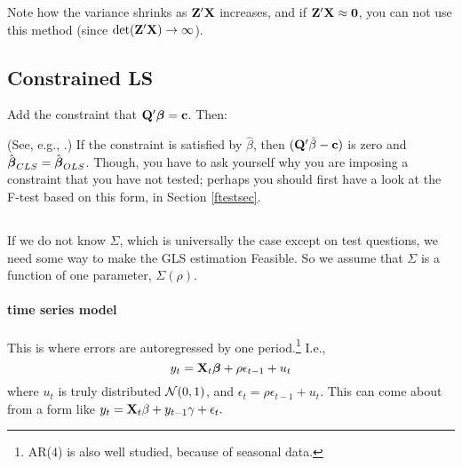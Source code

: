 
Note how the variance shrinks as ${\bf Z}'{\bf X}$ increases, and if
${\bf Z}'{\bf X}\approx{\bf 0}$, you can not use this method (since
$\det({\bf Z}'{\bf X}) \to \infty$). 

\subsection{Constrained LS }
\label{constrainedls}

Add the constraint that ${\bf Q}'{\mbox{\boldmath$\beta$}}={\bf c}$. Then:

(See, e.g., \cite{amemiya:ez}.)
If the constraint is satisfied by $\hat\beta$, then
$({\bf Q}'\hat\beta-{\bf c})$ is zero and $\hat{{\mbox{\boldmath$\beta$}}}_{CLS}=\hat{{\mbox{\boldmath$\beta$}}}_{OLS}$.
Though, you have to ask yourself why you are imposing a constraint that
you have not tested; perhaps you should first have a look at the F-test
based on this form, in Section \ref{ftestsec}.

\subsection{}

If we do not know $\Sigma$, which is universally the case except on
test questions, we need some way to make the GLS estimation Feasible. So we
assume that $\Sigma$ is a function of one parameter, $\Sigma(\rho)$.

\label{ts}
\paragraph{ time series model}

This is where errors are autoregressed by one period.\footnote{AR(4) is
also well studied, because of seasonal data.} I.e.,
$$y_t={\bf X}_t{\mbox{\boldmath$\beta$}} + \rho\epsilon_{t-1} + u_t$$
where $u_t$ is truly distributed ${\cal N}(0,1)$, and $\epsilon_t=
\rho\epsilon_{t-1} + u_t$. This can come about from  a form like
$y_t={\bf X}_t\beta + y_{t-1}\gamma + \epsilon_t.$


